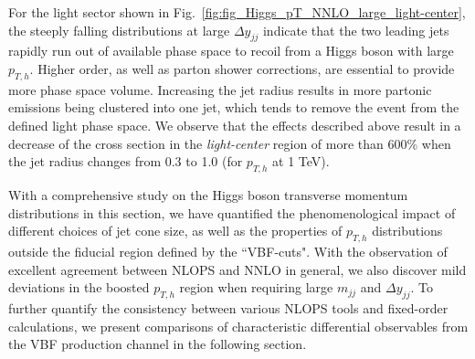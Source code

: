 \documentclass[10pt,prd,fleqn,superscriptaddress,notitlepage,nofootinbib,preprintnumbers,nobalancelastpage]{revtex4-1}
\begin{document}
For the light sector shown in Fig.~\ref{fig:fig_Higgs_pT_NNLO_large_light-center}, the steeply falling  distributions at large $\Delta y_{jj}$  indicate that the two leading jets rapidly run out of available phase space  to recoil from a Higgs boson with large $p_{T,h}$. Higher order, as well as parton shower corrections, are essential to provide more phase space volume.
Increasing the jet radius results in more partonic emissions being clustered into one jet, which  tends to remove the event from the defined  light phase space.
We observe that the effects described above result in  a decrease of the cross section in the \textit{light-center} region  of more than 600\% when the jet radius changes from 0.3 to 1.0 (for $p_{T,h}$ at 1 TeV).

With a comprehensive study on the Higgs boson transverse momentum distributions in this section, we have quantified the phenomenological impact of different choices of jet cone size, as well as the properties of $p_{T,h}$ distributions outside the fiducial region defined by the ``VBF-cuts". With the observation of excellent agreement between NLOPS and NNLO in general, we also discover mild deviations in the boosted $p_{T,h}$ region when requiring large $m_{jj}$ and $\Delta y_{jj}$. To further quantify the consistency between various NLOPS tools and fixed-order calculations, we present comparisons of characteristic differential observables from the VBF production channel in the following section.
\end{document}
